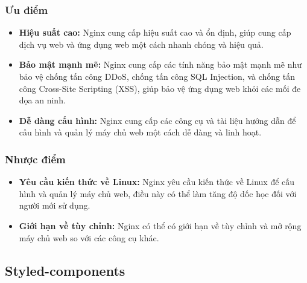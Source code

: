 \subsubsection{Ưu điểm}
\begin{itemize}
  \item \textbf{Hiệu suất cao:} Nginx cung cấp hiệu suất cao và ổn định, giúp cung cấp dịch vụ web và ứng dụng web một cách nhanh chóng và hiệu quả.
  \item \textbf{Bảo mật mạnh mẽ:} Nginx cung cấp các tính năng bảo mật mạnh mẽ như bảo vệ chống tấn công DDoS, chống tấn công SQL Injection, và chống tấn công Cross-Site Scripting (XSS), giúp bảo vệ ứng dụng web khỏi các mối đe dọa an ninh.
  \item \textbf{Dễ dàng cấu hình:} Nginx cung cấp các công cụ và tài liệu hướng dẫn để cấu hình và quản lý máy chủ web một cách dễ dàng và linh hoạt.
\end{itemize}
\subsubsection{Nhược điểm}
\begin{itemize}
  \item \textbf{Yêu cầu kiến thức về Linux:} Nginx yêu cầu kiến thức về Linux để cấu hình và quản lý máy chủ web, điều này có thể làm tăng độ dốc học đối với người mới sử dụng.
  \item \textbf{Giới hạn về tùy chỉnh:} Nginx có thể có giới hạn về tùy chỉnh và mở rộng máy chủ web so với các công cụ khác.
\end{itemize}
\subsection{Styled-components}
